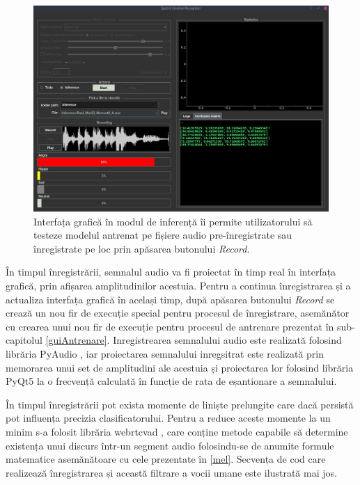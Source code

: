 \documentclass[a4paper,12pt]{book}
\begin{document}
		\begin{figure}[t]
			\hspace{-0.3cm}
			\includegraphics[scale=0.35]{gui_inf}
			\caption{Interfața grafică în modul de inferență îi permite utilizatorului să testeze modelul antrenat pe fișiere audio pre-înregistrate sau înregistrate pe loc prin apăsarea butonului \textit{Record}.}
			\label{fig:gui_inf}
		\end{figure} 
		În timpul înregistrării, semnalul audio va fi proiectat în timp real în interfața grafică, prin afișarea amplitudinilor acestuia. Pentru a continua înregistrarea și a actualiza interfața grafică în același timp, după apăsarea butonului \textit{Record} se crează un nou fir de execuție special pentru procesul de înregistrare, asemănător cu crearea unui nou fir de execuție pentru procesul de antrenare prezentat în sub-capitolul \ref{guiAntrenare}. Inregistrearea semnalului audio este realizată folosind librăria PyAudio \cite{pyaudio}, iar proiectarea semnalului inregsitrat este realizată prin memorarea unui set de amplitudini ale acestuia și proiectarea lor folosind librăria PyQt5 la o frecvență calculată în funcție de rata de eșantionare a semnalului. \par
		În timpul înregistrării pot exista momente de liniște prelungite care dacă persistă pot influența precizia clasificatorului. Pentru a reduce aceste momente la un minim s-a folosit librăria webrtcvad \cite{vad}, care conține metode capabile să determine existența unui discurs într-un segment audio folosindu-se de anumite formule matematice asemănătoare cu cele prezentate în \ref{mel}. Secvența de cod care realizează înregistrarea și această filtrare a vocii umane este ilustrată mai jos.
\end{document}
